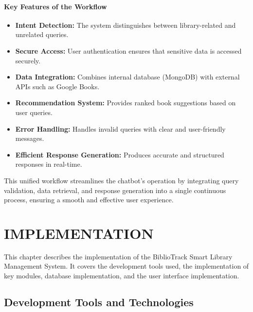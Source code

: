 \documentclass[12pt,a4paper]{report}
\begin{document}
\newpage

\subsubsection{Key Features of the Workflow}

\begin{itemize}
    \item \textbf{Intent Detection:} The system distinguishes between library-related and unrelated queries.
    
    \item \textbf{Secure Access:} User authentication ensures that sensitive data is accessed securely.
        
    \item \textbf{Data Integration:} Combines internal database (MongoDB) with external APIs such as Google Books.
    
    \item \textbf{Recommendation System:} Provides ranked book suggestions based on user queries.
    
    \item \textbf{Error Handling:} Handles invalid queries with clear and user-friendly messages.
    
    \item \textbf{Efficient Response Generation:} Produces accurate and structured responses in real-time.
\end{itemize}

This unified workflow streamlines the chatbot's operation by integrating query validation, data retrieval, and response generation into a single continuous process, ensuring a smooth and effective user experience.

\newpage
\chapter{IMPLEMENTATION}

This chapter describes the implementation of the BiblioTrack Smart Library Management System. It covers the development tools used, the implementation of key modules, database implementation, and the user interface implementation.

\section{Development Tools and Technologies}
\label{sec:devtools}
\end{document}
